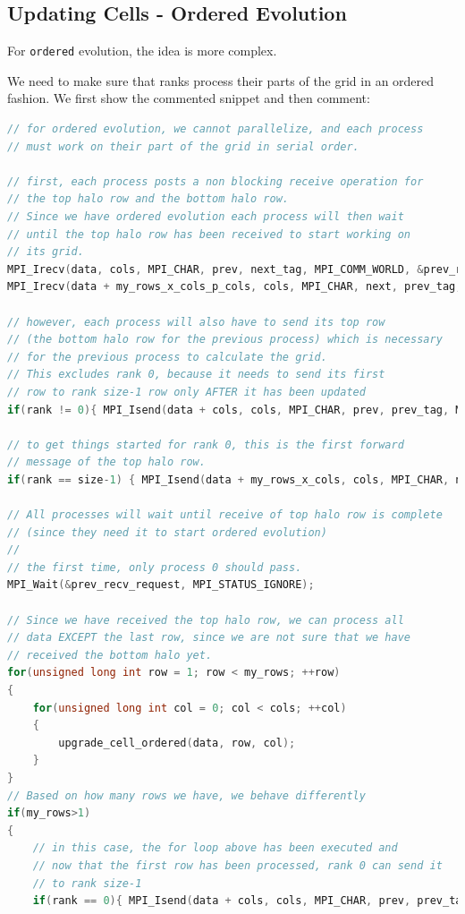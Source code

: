 \documentclass{report}
\begin{document}
\subsection{Updating Cells - Ordered Evolution}

For \texttt{ordered} evolution, the idea is more complex.   

We need to make sure that ranks process their parts of the grid in an ordered 
fashion. We first show the commented snippet and then comment:

\begin{lstlisting}[language=C++]
// for ordered evolution, we cannot parallelize, and each process 
// must work on their part of the grid in serial order. 

// first, each process posts a non blocking receive operation for 
// the top halo row and the bottom halo row. 
// Since we have ordered evolution each process will then wait 
// until the top halo row has been received to start working on 
// its grid.
MPI_Irecv(data, cols, MPI_CHAR, prev, next_tag, MPI_COMM_WORLD, &prev_recv_request);
MPI_Irecv(data + my_rows_x_cols_p_cols, cols, MPI_CHAR, next, prev_tag, MPI_COMM_WORLD, &next_recv_request);

// however, each process will also have to send its top row 
// (the bottom halo row for the previous process) which is necessary 
// for the previous process to calculate the grid.
// This excludes rank 0, because it needs to send its first
// row to rank size-1 row only AFTER it has been updated 
if(rank != 0){ MPI_Isend(data + cols, cols, MPI_CHAR, prev, prev_tag, MPI_COMM_WORLD, &prev_send_request);}

// to get things started for rank 0, this is the first forward 
// message of the top halo row.
if(rank == size-1) { MPI_Isend(data + my_rows_x_cols, cols, MPI_CHAR, next, next_tag, MPI_COMM_WORLD, &next_send_request); }

// All processes will wait until receive of top halo row is complete 
// (since they need it to start ordered evolution)
//
// the first time, only process 0 should pass.
MPI_Wait(&prev_recv_request, MPI_STATUS_IGNORE);

// Since we have received the top halo row, we can process all 
// data EXCEPT the last row, since we are not sure that we have 
// received the bottom halo yet.
for(unsigned long int row = 1; row < my_rows; ++row)
{
    for(unsigned long int col = 0; col < cols; ++col)
    {
        upgrade_cell_ordered(data, row, col);
    }
}
// Based on how many rows we have, we behave differently
if(my_rows>1)
{
    // in this case, the for loop above has been executed and 
    // now that the first row has been processed, rank 0 can send it 
    // to rank size-1
    if(rank == 0){ MPI_Isend(data + cols, cols, MPI_CHAR, prev, prev_tag, MPI_COMM_WORLD, &prev_send_request);}


\end{lstlisting}
\end{document}
